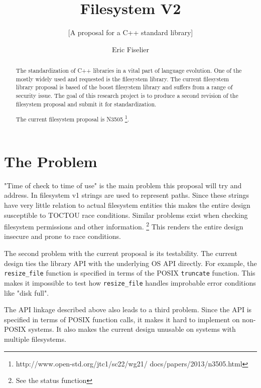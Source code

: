 \documentclass{acm_proc_article-sp}
\begin{document}
\title{Filesystem V2}
\subtitle{[A proposal for a C++ standard library]}

\author{
\alignauthor
Eric Fiselier
}
\maketitle

\begin{abstract}
    The standardization of C++ libraries in a vital part of language evolution.
    One of the mostly widely used and requested is the filesystem library. The
    current filesystem library proposal is based of the boost filesystem library
    and suffers from a range of security issue. The goal of this research project
    is to produce a second revision of the filesystem proposal and submit it for
    standardization.

    The current filesystem proposal is N3505
    \footnote{http://www.open-std.org/jtc1/sc22/wg21/ docs/papers/2013/n3505.html}.

\end{abstract}

\section{The Problem}
    "Time of check to time of use" is the main problem this proposal will try
    and address. In filesystem v1 strings are used to represent paths. Since
    these strings have very little relation to actual filesystem entities this
    makes the entire design susceptible to TOCTOU race conditions. Similar
    problems exist when checking filesystem permissions and other information.
    \footnote{See the status function}
    This renders the entire design insecure and prone to race conditions.

    The second problem with the current proposal is its testability. The current
    design ties the library API with the underlying OS API directly. For
    example, the \verb&resize_file& function is specified in terms of the POSIX
    \verb&truncate& function. This makes it impossible to test how \verb&resize_file&
    handles improbable error conditions like "disk full".

    The API linkage described above also leads to a third problem. Since the API
    is specified in terms of POSIX function calls, it makes it hard to implement
    on non-POSIX systems. It also makes the current design unusable on systems
    with multiple filesystems.
\end{document}
